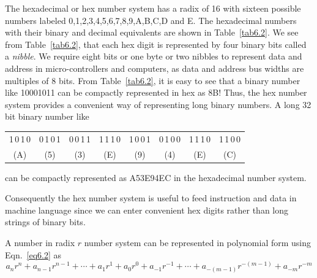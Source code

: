 The hexadecimal or hex number system has a radix of 16 with sixteen possible numbers labeled 0,1,2,3,4,5,6,7,8,9,A,B,C,D and E. The hexadecimal numbers with their binary and decimal equivalents are shown in Table~\ref{tab6.2}. We see from Table~\ref{tab6.2}, that each hex digit is represented by four binary bits called a {\em nibble}. We require eight bits or one byte or two nibbles to represent data and address in micro-controllers and computers, as data and address bus widths are multiples of 8 bits. From Table~\ref{tab6.2}, it is easy to see that a binary number like 10001011 can be compactly represented in hex as 8B! Thus, the hex number system provides a convenient way of representing long binary numbers. A long 32 bit binary number like
\begin{center}
\begin{tabular}{cccccccc}
1\,0\,1\,0 & 0\,1\,0\,1 & 0\,0\,1\,1 & 1\,1\,1\,0 & 1\,0\,0\,1 & 0\,1\,0\,0 & 1\,1\,1\,0 & 1\,1\,0\,0\\[3pt]
(A) & (5) & (3) & (E) & (9) & (4) & (E) & (C)
\end{tabular}
\end{center}
can be compactly represented as A53E94EC in the hexadecimal number system.

Consequently the hex number system is useful to feed instruction and data in machine language since we can enter convenient hex digits rather than long strings of binary bits.

A number in radix $r$ number system can be represented in polynomial form using Eqn.~\eqref{eq6.2} as
$$
a_{n}r^{n}+a_{n-1}r^{n-1}+\cdots+a_{1}r^{1}+a_{0}r^{0}+a_{-1}r^{-1}+\cdots+a_{-(m-1)}r^{-(m-1)}+a_{-m}r^{-m}
$$

